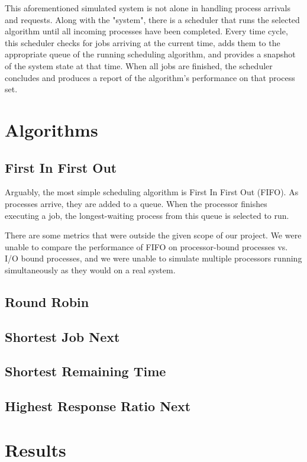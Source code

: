 \documentclass[conference,11pt]{IEEEtran}
\begin{document}
This aforementioned simulated system is not alone in handling process arrivals and requests. Along with the "system", there is a scheduler that runs the selected algorithm until all incoming processes have been completed. Every time cycle, this scheduler checks for jobs arriving at the current time, adds them to the appropriate queue of the running scheduling algorithm, and provides a snapshot of the system state at that time. When all jobs are finished, the scheduler concludes and produces a report of the algorithm's performance on that process set.

\section{Algorithms}

\subsection{First In First Out}
Arguably, the most simple scheduling algorithm is First In First Out (FIFO). As processes arrive, they are added to a queue. When the processor finishes executing a job, the longest-waiting process from this queue is selected to run.

There are some metrics that were outside the given scope of our project. We were unable to compare the performance of FIFO on processor-bound processes vs. I/O bound processes, and we were unable to simulate multiple processors running simultaneously as they would on a real system.

\subsection{Round Robin}


\subsection{Shortest Job Next}


\subsection{Shortest Remaining Time}


\subsection{Highest Response Ratio Next}


\section{Results}
\end{document}
